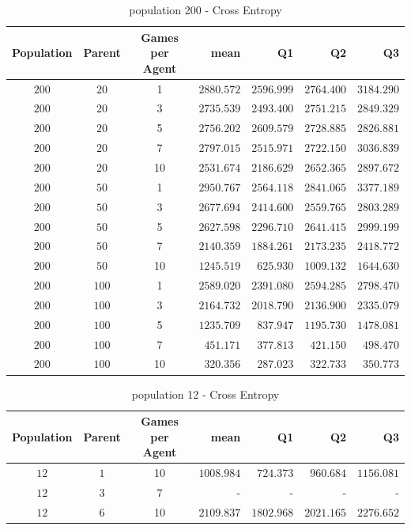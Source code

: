 \begin{table}[H]
\centering
\small
\begin{tabular}{c c c r r r r}
Population & Parent & Games per Agent & mean & Q1 & Q2 & Q3\\
\hline
\hdashline
$200$ & $20$ & 1 & $2880.572$ & $2596.999$ & $2764.400$ & $3184.290$\\
\hdashline
$200$ & $20$ & 3 & $2735.539$ & $2493.400$ & $2751.215$ & $2849.329$\\
$200$ & $20$ & 5 & $2756.202$ & $2609.579$ & $2728.885$ & $2826.881$\\
$200$ & $20$ & 7 & $2797.015$ & $2515.971$ & $2722.150$ & $3036.839$\\
$200$ & $20$ & 10 & $2531.674$ & $2186.629$ & $2652.365$ & $2897.672$\\
\hdashline
$200$ & $50$ & 1 & $2950.767$ & $2564.118$ & $2841.065$ & $3377.189$\\
\hdashline
$200$ & $50$ & 3 & $2677.694$ & $2414.600$ & $2559.765$ & $2803.289$\\
$200$ & $50$ & 5 & $2627.598$ & $2296.710$ & $2641.415$ & $2999.199$\\
$200$ & $50$ & 7 & $2140.359$ & $1884.261$ & $2173.235$ & $2418.772$\\
$200$ & $50$ & 10 & $1245.519$ & $625.930$ & $1009.132$ & $1644.630$\\
\hdashline
$200$ & $100$ & 1 & $2589.020$ & $2391.080$ & $2594.285$ & $2798.470$\\
\hdashline
$200$ & $100$ & 3 & $2164.732$ & $2018.790$ & $2136.900$ & $2335.079$\\
$200$ & $100$ & 5 & $1235.709$ & $837.947$ & $1195.730$ & $1478.081$\\
$200$ & $100$ & 7 & $451.171$ & $377.813$ & $421.150$ & $498.470$\\
$200$ & $100$ & 10 & $320.356$ & $287.023$ & $322.733$ & $350.773$\\
\end{tabular}
\caption{population 200 - Cross Entropy}
\end{table}

\clearpage

\begin{table}[H]
\centering
\small
\begin{tabular}{c c c r r r r}
Population & Parent & Games per Agent & mean & Q1 & Q2 & Q3\\
\hline
$12$ & $1$ & 10 & $1008.984$ & $724.373$ & $960.684$ & $1156.081$\\
$12$ & $3$ & 7 & - & - & - & -\\
$12$ & $6$ & 10 & $2109.837$ & $1802.968$ & $2021.165$ & $2276.652$\\
\end{tabular}
\caption{population 12 - Cross Entropy}
\end{table}

